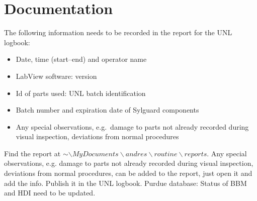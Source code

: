 \documentclass[12pt]{unlsilabsop}
\begin{document}
\section{Documentation}
The following information needs to be recorded in the report for the UNL logbook:
\begin{itemize}
    \item Date, time (start--end) and operator name
    \item LabView software: version
    \item Id of parts used: UNL batch identification
    \item Batch number and expiration date of Sylguard components
    \item Any special observations, e.g.~damage to parts not already recorded during visual inspection, deviations from normal procedures
\end{itemize}

Find the report at $\sim\backslash MyDocuments\backslash andres\backslash routine\backslash reports$. Any special observations, e.g. damage to parts not already recorded during visual inspection, deviations from normal procedures, can be added to the report, just open it and add the info. Publish it in the UNL logbook. 
Purdue database: Status of BBM and HDI need to be updated.
\end{document}
